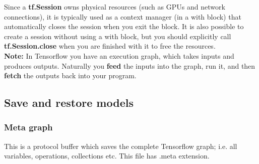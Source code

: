     Since a \textbf{tf.Session} owns physical resources (such as GPUs and network connections), it is typically used as a context manager (in a with block) that automatically closes the session when you exit the block. It is also possible to create a session without using a with block, but you should explicitly call \textbf{tf.Session.close} when you are finished with it to free the resources.\\
    \textbf{Note: }In Tensorflow you have an execution graph, which takes inputs and produces outputs. Naturally you \textbf{feed} the inputs into the graph, run it, and then \textbf{fetch} the outputs back into your program.\\
    \subsection{Save and restore models}
    \subsubsection{Meta graph}
    This is a protocol buffer which saves the complete Tensorflow graph; i.e. all variables, operations, collections etc. This file has .meta extension.
